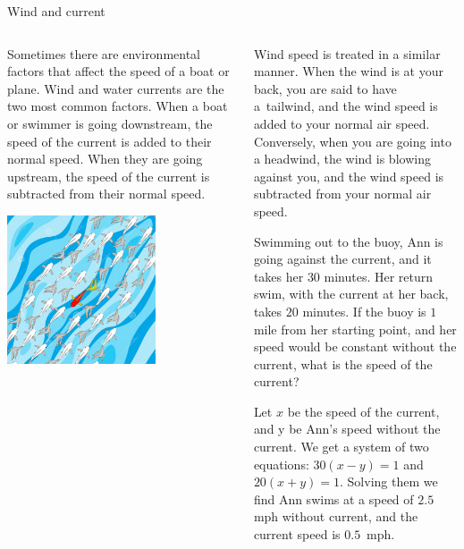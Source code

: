 \documentclass[9pt,aspectratio=169]{beamer}
\begin{document}
\begin{frame}{Wind and current}
  \begin{columns}[T]
    \begin{column}{0.5\textwidth}
      Sometimes there are environmental factors that affect the speed of a boat or plane.  Wind and water currents are the two most common factors.  When a boat or swimmer is going downstream, the speed of the current is added to their normal speed.  When they are going upstream, the speed of the current is subtracted from their normal speed.

      {\centering
      \includegraphics[width=0.65\textwidth]{09 - Rate/fish.jpg}\par}
    \end{column}
    \begin{column}{0.5\textwidth}
      Wind speed is treated in a similar manner.  When the wind is at your back, you are said to have a~tailwind, and the wind speed is added to your normal air speed.  Conversely, when you are going into a headwind, the wind is blowing against you, and the wind speed is subtracted from your normal air speed.
      \begin{problem}
        Swimming out to the buoy, Ann is going against the current, and it takes her $30$ minutes.  Her return swim, with the current at her back, takes $20$ minutes.  If the buoy is $1$ mile from her starting point, and her speed would be constant without the current, what is the speed of the current?
      \end{problem}
      Let $x$ be the speed of the current, and y be Ann’s speed without the current.  We get a system of two equations: $30(x - y) = 1$ and $20(x+y) = 1$.  Solving them we find Ann swims at a speed of $2{.}5$ mph without current, and the current speed is $0{.}5$~mph.
    \end{column}
  \end{columns}
\end{frame}
\end{document}

